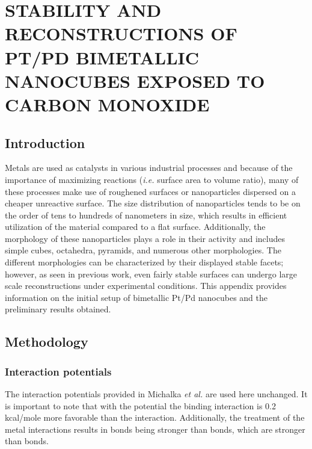 \chapter{STABILITY AND RECONSTRUCTIONS OF PT/PD BIMETALLIC NANOCUBES EXPOSED TO CARBON MONOXIDE}
\label{app:cube}

\section{Introduction}

Metals are used as catalysts in various industrial processes and because of the
importance of maximizing reactions ({\em i.e.} surface area to volume ratio),
many of these processes make use of roughened surfaces or nanoparticles
dispersed on a cheaper unreactive surface.\citep{Munnik:2015qf, Graham:2007ng}
The size distribution of nanoparticles tends to be on the order of tens to
hundreds of nanometers in size, which results in efficient utilization of the
material compared to a flat surface.\citep{Zhang:2011ne, Liu:2013hf}
Additionally, the morphology of these nanoparticles plays a role in their
activity and includes simple cubes, octahedra, pyramids, and numerous other
morphologies.\citep{Ahmadi:2015os, Wang:2015qb, Wang:2016dg} The different
morphologies can be characterized by their displayed stable facets;
however, as seen in previous work\citep{Tao:2010aa, Michalka:2013aa,
Michalka:2015aa, Kim:2016cr}, even fairly stable surfaces can undergo large
scale reconstructions under experimental conditions. This appendix provides
information on the initial setup of bimetallic Pt/Pd nanocubes and the
preliminary results obtained. 

\section{Methodology}
\subsection{Interaction potentials}
The interaction potentials provided in Michalka {\em et
al.}\citep{Michalka:2015aa} are used here unchanged. It is important to note
that with the potential the  binding interaction is 0.2
kcal/mole more favorable than the  interaction. Additionally,
the treatment of the metal interactions results in  bonds
being stronger than  bonds, which are stronger than
 bonds.

